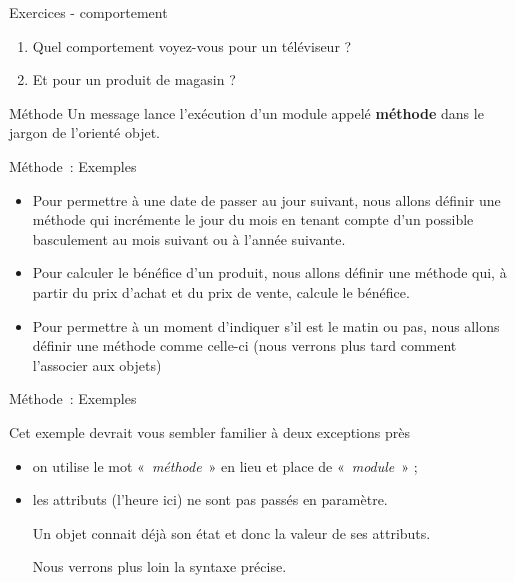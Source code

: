\begin{frame}{Exercices - comportement}
	\begin{enumerate}
		\item
			Quel comportement voyez-vous pour un téléviseur ?
		\item
			Et pour un produit de magasin ?
	\end{enumerate}
\end{frame}

\begin{frame}{Méthode}
	Un message lance l'exécution d'un
	module appelé \textbf{méthode} dans le jargon de
	l'orienté objet.
\end{frame}

\begin{frame}{Méthode~: Exemples}
	\begin{itemize}
		\item
			Pour permettre à une date de passer au jour suivant, nous allons définir
			une méthode qui incrémente le jour du mois en tenant compte
			d'un possible basculement au mois suivant ou à
			l'année suivante.
		\item
			Pour calculer le bénéfice d'un produit, nous allons définir
			une méthode qui, à partir du prix d'achat et du prix de vente,
			calcule le bénéfice.
		\item 
			Pour permettre à un moment d'indiquer
			s'il est le matin ou pas, nous allons définir une
			méthode comme celle-ci (nous verrons plus tard comment
			l'associer aux objets)
	\end{itemize}
\end{frame}

\begin{frame}{Méthode~: Exemples}
	
	\medskip
	Cet exemple devrait vous sembler familier à deux exceptions près

	\begin{itemize}
		\item
			on utilise le mot «~\textit{méthode}~» en lieu et place de
			«~\textit{module}~» ;
		\item
			les attributs (l'heure ici) ne sont pas passés en
			paramètre. 
			
			Un objet connait déjà son état et donc la valeur de ses
			attributs. 
			
			Nous verrons plus loin la syntaxe précise.
	\end{itemize}
\end{frame}

